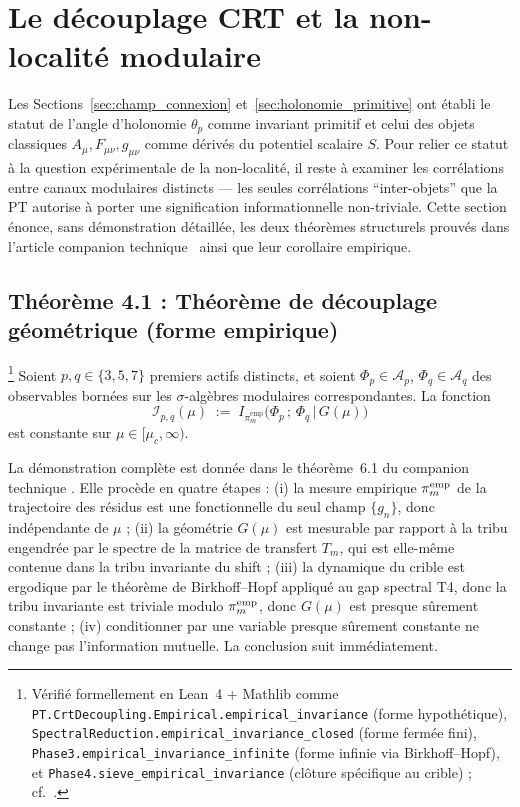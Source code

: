 \section{Le découplage CRT et la non-localité modulaire}
\label{sec:decouplage_crt}

Les Sections~\ref{sec:champ_connexion} et~\ref{sec:holonomie_primitive}
ont établi le statut de l'angle d'holonomie $\theta_p$ comme
invariant primitif et celui des objets classiques $A_\mu,
F_{\mu\nu}, g_{\mu\nu}$ comme dérivés du potentiel scalaire $S$.
Pour relier ce statut à la question expérimentale de la
non-localité, il reste à examiner les corrélations entre canaux
modulaires distincts --- les seules corrélations
``inter-objets'' que la PT autorise à porter une signification
informationnelle non-triviale. Cette section énonce, sans
démonstration détaillée, les deux théorèmes structurels prouvés
dans l'article companion technique~\cite{PT_CRT_DECOUPLING}
ainsi que leur corollaire empirique.

\subsection{Théorème 4.1 : Théorème de découplage géométrique (forme empirique)}
\label{ssec:thm_4_1_fr}

\begin{theoreme}
\label{thm:invariance_geom}
\footnote{Vérifié formellement en Lean~4 + Mathlib comme
\texttt{PT.CrtDecoupling.Empirical.empirical\_invariance}
(forme hypothétique),
\texttt{SpectralReduction.empirical\_invariance\_closed}
(forme fermée fini),
\texttt{Phase3.empirical\_invariance\_infinite}
(forme infinie via Birkhoff--Hopf), et
\texttt{Phase4.sieve\_empirical\_invariance}
(clôture spécifique au crible) ;
cf.~\cite[\S~8.5]{PT_CRT_DECOUPLING}.}
Soient $p, q \in \{3, 5, 7\}$ premiers actifs distincts, et soient
$\Phi_p \in \mathcal{A}_p$, $\Phi_q \in \mathcal{A}_q$ des
observables bornées sur les $\sigma$-algèbres modulaires
correspondantes. La fonction
\begin{equation}
  \mathcal{I}_{p,q}(\mu)
  \;:=\;
  I_{\pi_m^{\mathrm{emp}}}\!\bigl(\Phi_p\,;\,\Phi_q \,\big|\, G(\mu)\bigr)
\end{equation}
est constante sur $\mu \in [\mu_c, \infty)$.
\end{theoreme}

La démonstration complète est donnée dans le théorème~6.1
du companion technique \cite{PT_CRT_DECOUPLING}. Elle procède en
quatre étapes : (i) la mesure empirique $\pi_m^{\rm emp}$ de la
trajectoire des résidus est une fonctionnelle du seul champ
$\{g_n\}$, donc indépendante de $\mu$ ; (ii) la géométrie
$G(\mu)$ est mesurable par rapport à la tribu engendrée par le
spectre de la matrice de transfert $T_m$, qui est elle-même
contenue dans la tribu invariante du shift ; (iii) la dynamique du
crible est ergodique par le théorème de Birkhoff--Hopf appliqué
au gap spectral T4, donc la tribu invariante est triviale
modulo $\pi_m^{\rm emp}$, donc $G(\mu)$ est presque sûrement
constante ; (iv) conditionner par une variable presque sûrement
constante ne change pas l'information mutuelle. La conclusion
suit immédiatement.

